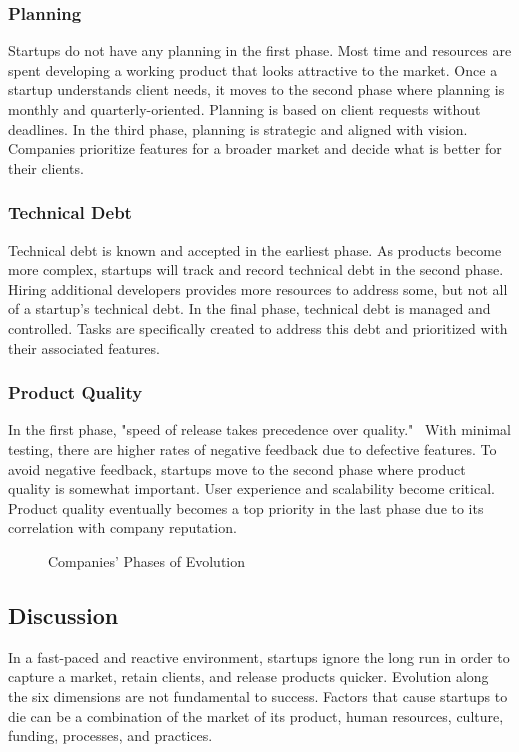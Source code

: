 \documentclass{sig-alternate}
\begin{document}
\subsubsection{Planning}
Startups do not have any planning in the first phase. Most time and resources are spent developing a working product that looks attractive to the market. Once a startup understands client needs, it moves to the second phase where planning is monthly and quarterly-oriented. Planning is based on client requests without deadlines. In the third phase, planning is strategic and aligned with vision. Companies prioritize features for a broader market and decide what is better for their clients.

\subsubsection{Technical Debt}
Technical debt is known and accepted in the earliest phase. As products become more complex, startups will track and record technical debt in the second phase. Hiring additional developers provides more resources to address some, but not all of a startup's technical debt. In the final phase, technical debt is managed and controlled. Tasks are specifically created to address this debt and prioritized with their associated features.

\subsubsection{Product Quality}
In the first phase, "speed of release takes precedence over quality."~\cite{Gralha:2018} With minimal testing, there are higher rates of negative feedback due to defective features. To avoid negative feedback, startups move to the second phase where product quality is somewhat important. User experience and scalability become critical. Product quality eventually becomes a top priority in the last phase due to its correlation with company reputation.

\begin{figure}
\centering
{}
\caption{Companies' Phases of Evolution}
\label{fig:companiesEvolution}
\end{figure}

\subsection{Discussion}
\label{sec:discussion}
In a fast-paced and reactive environment, startups ignore the long run in order to capture a market, retain clients, and release products quicker. Evolution along the six dimensions are not fundamental to success. Factors that cause startups to die can be a combination of the market of its product, human resources, culture, funding, processes, and practices.
\end{document}
